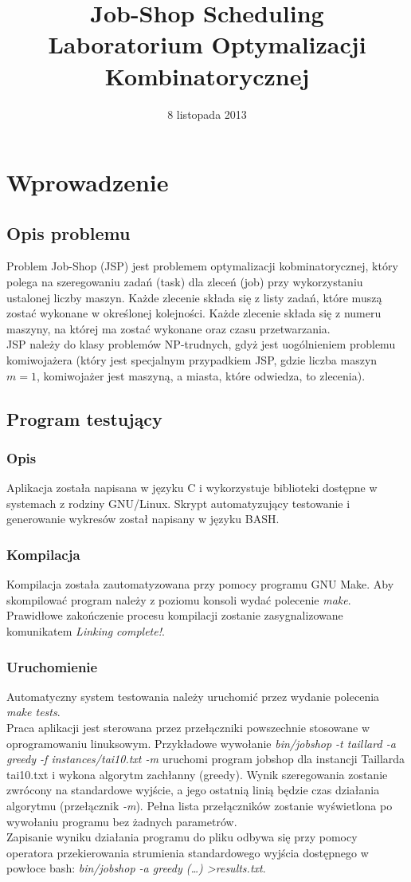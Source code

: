 \documentclass[10pt,a4paper]{article}
\author{\authorthing}
\date{8 listopada 2013}
\title{Job-Shop Scheduling\\Laboratorium Optymalizacji Kombinatorycznej}
\begin{document}
\maketitle
\section{Wprowadzenie}
\subsection{Opis problemu}
Problem Job-Shop (JSP) jest problemem optymalizacji kobminatorycznej, który polega na szeregowaniu zadań (task) dla zleceń (job) przy wykorzystaniu ustalonej liczby maszyn. Każde zlecenie składa się z listy zadań, które muszą zostać wykonane w określonej kolejności. Każde zlecenie składa się z numeru maszyny, na której ma zostać wykonane oraz czasu przetwarzania.\\
JSP należy do klasy problemów NP-trudnych, gdyż jest uogólnieniem problemu komiwojażera (który jest specjalnym przypadkiem JSP, gdzie liczba maszyn $m=1$, komiwojażer jest maszyną, a miasta, które odwiedza, to zlecenia).
\subsection{Program testujący}
\subsubsection{Opis}
Aplikacja została napisana w języku C i wykorzystuje biblioteki dostępne w systemach z rodziny GNU/Linux. Skrypt automatyzujący testowanie i generowanie wykresów został napisany w języku BASH.
\subsubsection{Kompilacja}
Kompilacja została zautomatyzowana przy pomocy programu GNU Make. Aby skompilować program należy z poziomu konsoli wydać polecenie \textit{make}. Prawidłowe zakończenie procesu kompilacji zostanie zasygnalizowane komunikatem \textit{Linking complete!}.
\subsubsection{Uruchomienie}
Automatyczny system testowania należy uruchomić przez wydanie polecenia \textit{make tests}.\\
Praca aplikacji jest sterowana przez przełączniki powszechnie stosowane w oprogramowaniu linuksowym. Przykładowe wywołanie \textit{bin/jobshop -t taillard -a greedy -f instances/tai10.txt -m} uruchomi program jobshop dla instancji Taillarda tai10.txt i wykona algorytm zachłanny (greedy). Wynik szeregowania zostanie zwrócony na standardowe wyjście, a jego ostatnią linią będzie czas działania algorytmu (przełącznik \textit{-m}). Pełna lista przełączników zostanie wyświetlona po wywołaniu programu bez żadnych parametrów.\\
Zapisanie wyniku działania programu do pliku odbywa się przy pomocy operatora przekierowania strumienia standardowego wyjścia dostępnego w powłoce bash: \textit{bin/jobshop -a greedy (\ldots) \textgreater results.txt}.
\end{document}
